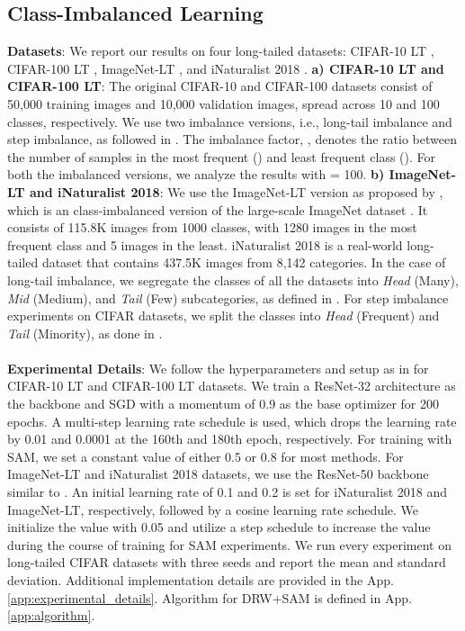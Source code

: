 \documentclass{article}
\begin{document}
\subsection{Class-Imbalanced Learning}
 \textbf{Datasets}: We report our results on four long-tailed datasets: CIFAR-10 LT \cite{cao2019learning}, CIFAR-100 LT \cite{cao2019learning}, ImageNet-LT \cite{liu2019large}, and iNaturalist 2018 \cite{van2018inaturalist}. 
\textbf{a) CIFAR-10 LT and CIFAR-100 LT}: The original CIFAR-10 and CIFAR-100 datasets consist of 50,000 training images and 10,000 validation images, spread across 10 and 100 classes, respectively. We use two imbalance versions, i.e., long-tail imbalance and step imbalance, as followed in \citet{cao2019learning}. The imbalance factor, , denotes the ratio between the number of samples in the most frequent () and least frequent class (). For both the imbalanced versions, we analyze the results with  = 100.  \textbf{b) ImageNet-LT and iNaturalist 2018}: We use the ImageNet-LT version as proposed by \cite{liu2019large}, which is an class-imbalanced version of the large-scale ImageNet dataset \cite{russakovsky2015imagenet}. It consists of 115.8K images from 1000 classes, with 1280 images in the most frequent class and 5 images in the least. iNaturalist 2018 \cite{van2018inaturalist} is a real-world long-tailed dataset that contains 437.5K images from 8,142 categories. In the case of long-tail imbalance, we segregate the classes of all the datasets into \textit{Head} (Many), \textit{Mid} (Medium), and \textit{Tail} (Few) subcategories, as defined in \cite{zhong2021improving}. For step imbalance experiments on CIFAR datasets, we split the classes into \textit{Head} (Frequent) and \textit{Tail} (Minority), as done in \cite{cao2019learning}. \\
\\
\textbf{Experimental Details}:
We follow the hyperparameters and setup as in \citet{cao2019learning} for CIFAR-10 LT and CIFAR-100 LT datasets. We train a ResNet-32 architecture as the backbone and SGD with a momentum of 0.9 as the base optimizer for 200 epochs. A multi-step learning rate schedule is used, which drops the learning rate by 0.01 and 0.0001 at the 160th and 180th epoch, respectively. For training with SAM, we set a constant  value of either 0.5 or 0.8 for most methods. For ImageNet-LT and iNaturalist 2018 datasets, we use the ResNet-50 backbone similar to \cite{zhong2021improving}. An initial learning rate of 0.1 and 0.2 is set for iNaturalist 2018 and ImageNet-LT, respectively, followed by a cosine learning rate schedule. We initialize the  value with 0.05 and utilize a step schedule to increase the  value during the course of training for SAM experiments. We run every experiment on long-tailed CIFAR datasets with three seeds and report the mean and standard deviation. Additional implementation details are provided in the App. \ref{app:experimental_details}. Algorithm for DRW+SAM is defined in App. \ref{app:algorithm}.
\end{document}
